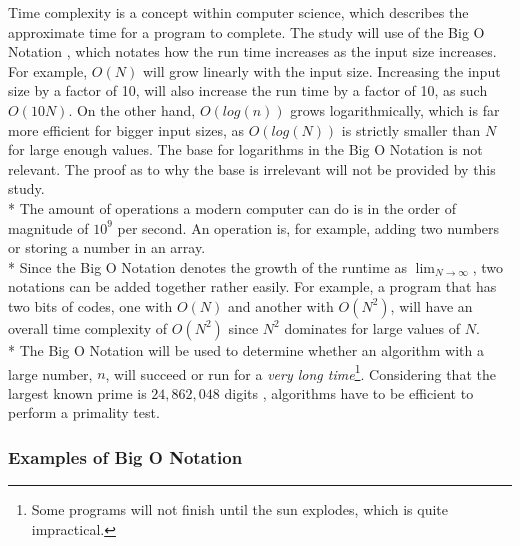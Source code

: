 \documentclass[main.tex]{subfiles}
\begin{document}
Time complexity \cite{theorem:time_comp} is a concept within computer science,
which describes the approximate time for a program to complete. The study will
use of the Big O Notation \cite{theorem:big_O}, which notates how the run time
increases as the input size increases. For example, $O(N)$ will grow linearly
with the input size. Increasing the input size by a factor of 10, will also
increase the run time by a factor of 10, as such $O(10N)$. On the other hand,
$O(log(n))$ grows logarithmically, which is far more efficient for bigger input
sizes, as $O(log(N))$ is strictly smaller than $N$ for large enough values. The
base for logarithms in the Big O Notation is not relevant. The proof as to why
the base is irrelevant will not be provided by this study. \newline
\\*
The amount of operations a modern computer can do is in the order of magnitude
of $10^{9}$ per second. An operation is, for example, adding two numbers or
storing a number in an array. \newline
\\*
Since the Big O Notation denotes the growth of the runtime as
$\lim_{N\to\infty}$, two notations can be added together rather easily. For
example, a program that has two bits of codes, one with $O(N)$ and another with
$O(N^{2})$, will have an overall time complexity of $O(N^{2})$ since $N^{2}$
dominates for large values of $N$. \newline
\\*
The Big O Notation will be used to determine whether an algorithm with a large
number, $n$, will succeed or run for a \textit{very long time}\footnote{Some
  programs will not finish until the sun explodes, which is quite impractical.}.
Considering that the largest known prime is $24,862,048$ digits
\cite{prime:largest_digits}, algorithms have to be efficient to perform a
primality test.

\newpage
\subsubsection{Examples of Big O Notation}
\end{document}
